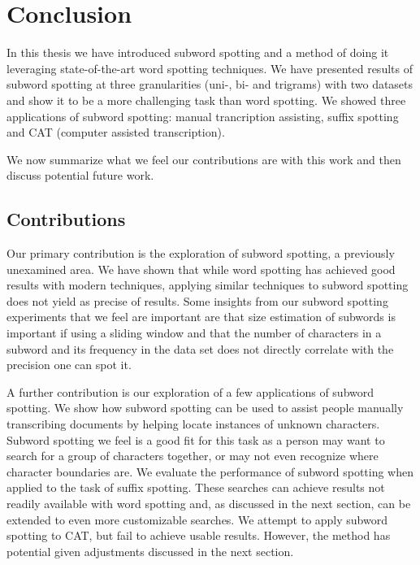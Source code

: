\documentclass[ms,electronic,twosidetoc,letterpaper,chaptercenter,parttop,lof,lot]{byumsphd}
\begin{document}




\chapter{Conclusion}

In this thesis we have introduced subword spotting and a method of doing it leveraging state-of-the-art word spotting techniques. We have presented results of subword spotting at three granularities (uni-, bi- and trigrams) with two datasets and show it to be a more challenging task than word spotting. We showed three applications of subword spotting: manual trancription assisting, suffix spotting and CAT (computer assisted transcription).

We now summarize what we feel our contributions are with this work and then discuss potential future work.

\section{Contributions}


Our primary contribution is the exploration of subword spotting, a previously unexamined area. We have shown that while word spotting has achieved good results with modern techniques, applying similar techniques to subword spotting does not yield as precise of results.
Some insights from our subword spotting experiments that we feel are important are that 
size estimation of subwords is important if using a sliding window
and that
the number of characters in a subword  and its frequency in the data set does not directly correlate with the precision one can spot it.

A further contribution is our exploration of a few applications of subword spotting.
We show how subword spotting can be used to assist people manually transcribing documents by helping locate instances of unknown characters. Subword spotting we feel is a good fit for this task as a person may want to search for a group of characters together, or may not even recognize where character boundaries are.
We evaluate the performance of subword spotting when applied to the task of suffix spotting. 
These searches can achieve results not readily available with word spotting and, as discussed in the next section, can be extended to even more customizable searches.
We attempt to apply subword spotting to CAT, but fail to achieve usable results. However, the method has potential given adjustments discussed in the next section.
\end{document}
